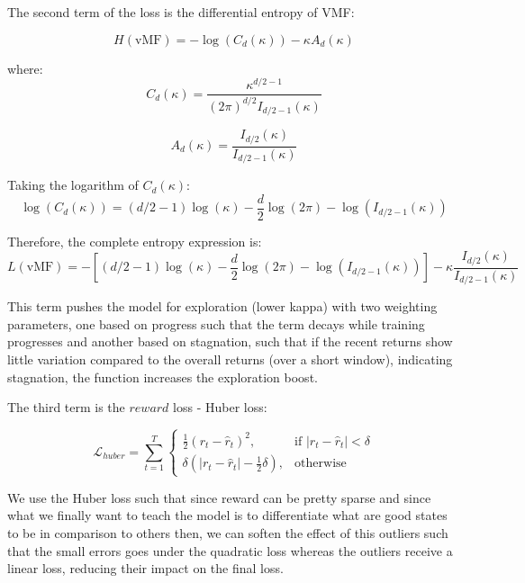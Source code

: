 \documentclass{article}  %
\begin{document}
The second term of the loss is the differential entropy of VMF:

\begin{equation}
    H(\text{vMF}) = -\log(C_d(\kappa)) - \kappa A_d(\kappa)
\end{equation}

where:
\begin{equation}
    C_d(\kappa) = \frac{\kappa^{d/2-1}}{(2\pi)^{d/2}I_{d/2-1}(\kappa)}
\end{equation}

\begin{equation}
    A_d(\kappa) = \frac{I_{d/2}(\kappa)}{I_{d/2-1}(\kappa)}
\end{equation}

Taking the logarithm of $C_d(\kappa)$:
\begin{equation}
    \log(C_d(\kappa)) = (d/2-1)\log(\kappa) - \frac{d}{2}\log(2\pi) - \log(I_{d/2-1}(\kappa))
\end{equation}

Therefore, the complete entropy expression is:
\begin{equation}
    L(\text{vMF}) = -\left[(d/2-1)\log(\kappa) - \frac{d}{2}\log(2\pi) - \log(I_{d/2-1}(\kappa))\right] - \kappa\frac{I_{d/2}(\kappa)}{I_{d/2-1}(\kappa)}
\end{equation}

This term pushes the model for exploration (lower kappa) with two weighting parameters, one based on progress such that the term decays while training progresses 
and another based on stagnation, such that if the recent returns show little variation compared to the overall returns (over a short window), 
indicating stagnation, the function increases the exploration boost.

The third term is the $reward$ loss - Huber loss:

\begin{equation}
    \mathcal{L}_{huber} = \sum_{t=1}^{T} \begin{cases} 
    \frac{1}{2} \left( r_{t} - \hat{r}_{t} \right)^{2}, & \text{if } \left| r_{t} - \hat{r}_{t} \right| < \delta \\
    \delta \left( \left| r_{t} - \hat{r}_{t} \right| - \frac{1}{2} \delta \right), & \text{otherwise}
    \end{cases}
\end{equation}

We use the Huber loss such that since reward can be pretty sparse and since what we finally want to teach the model is to differentiate 
what are good states to be in comparison to others then, we can soften the effect of this outliers such that the small errors goes under the quadratic 
loss whereas the outliers receive a linear loss, reducing their impact on the final loss. 
\end{document}
